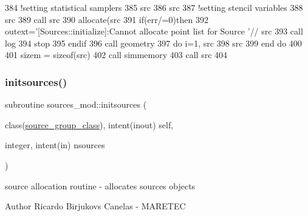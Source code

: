 \begin{DoxyCode}
384     \textcolor{comment}{!setting statistical samplers}
385     src%
386     src%
387     \textcolor{comment}{!setting stencil variables}
388     src%
389     \textcolor{keyword}{call }src%
390     \textcolor{keyword}{allocate}(src%
391     \textcolor{keywordflow}{if}(err/=0)\textcolor{keywordflow}{then}
392         outext=\textcolor{stringliteral}{'[Sources::initialize]:Cannot allocate point list for Source '}// src%
393         \textcolor{keyword}{call }log%
394         stop
395 \textcolor{keywordflow}{    endif}
396     \textcolor{keyword}{call }geometry%
397     \textcolor{keywordflow}{do} i=1, src%
398         src%
399 \textcolor{keywordflow}{    end do}
400 
401     sizem = sizeof(src)
402     \textcolor{keyword}{call }simmemory%
403     \textcolor{keyword}{call }src%
404 
\end{DoxyCode}
\mbox{\label{namespacesources__mod_a6da3303e5c39d77c0111ec50623bf5fe}} 
\subsubsection{\texorpdfstring{initsources()}{initsources()}}
{\footnotesize\ttfamily subroutine sources\+\_\+mod\+::initsources (\begin{DoxyParamCaption}\item[{class(\mbox{\hyperlink{structsources__mod_1_1source__group__class}{source\+\_\+group\+\_\+class}}), intent(inout)}]{self,  }\item[{integer, intent(in)}]{nsources }\end{DoxyParamCaption})\hspace{0.3cm}{\ttfamily [private]}}



source allocation routine -\/ allocates sources objects 

\begin{DoxyAuthor}{Author}
Ricardo Birjukovs Canelas -\/ M\+A\+R\+E\+T\+EC 
\end{DoxyAuthor}

